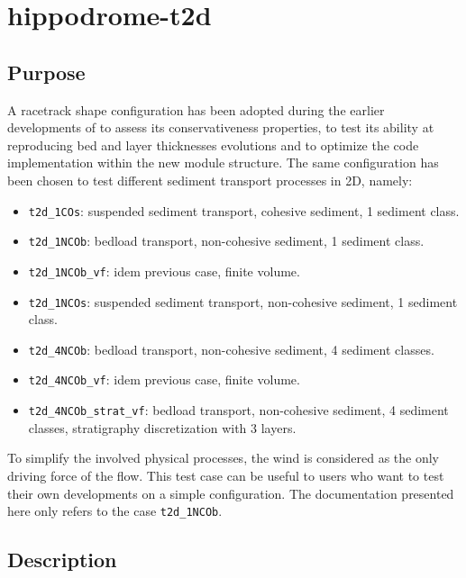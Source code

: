 \chapter{hippodrome-t2d}
%

%
\section{Purpose}
A racetrack shape configuration has been adopted during the earlier developments of \gaia{} to assess its conservativeness properties, to test its ability at reproducing bed and layer thicknesses evolutions and to optimize the code implementation within the new module structure. The same configuration has been chosen to test different sediment transport processes in 2D, namely:
\begin{itemize}
\item \texttt{t2d\_1COs}: suspended sediment transport, cohesive sediment, 1 sediment class.
\item \texttt{t2d\_1NCOb}: bedload transport, non-cohesive sediment, 1 sediment class.
\item \texttt{t2d\_1NCOb\_vf}: idem previous case, finite volume.
\item \texttt{t2d\_1NCOs}: suspended sediment transport, non-cohesive sediment, 1 sediment class.
\item \texttt{t2d\_4NCOb}: bedload transport, non-cohesive sediment, 4 sediment classes.
\item \texttt{t2d\_4NCOb\_vf}: idem previous case, finite volume.
\item \texttt{t2d\_4NCOb\_strat\_vf}: bedload transport, non-cohesive sediment, 4 sediment classes, stratigraphy discretization with 3 layers.
\end{itemize}

To simplify the involved physical processes, the wind is considered as the only driving force of the flow. This test case can be useful to users who want to test their own developments on a simple configuration. The documentation presented here only refers to the case \texttt{t2d\_1NCOb}.


\section{Description}

